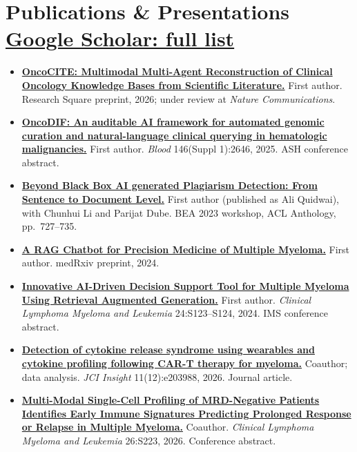 \documentclass[letterpaper,11pt]{article}
\newenvironment{bullets}{\begin{itemize}[leftmargin=12pt,itemsep=2pt,parsep=0pt,topsep=1.5pt]}{\end{itemize}\vspace{3pt}}
\begin{document}
\section{Publications \& Presentations \hfill \normalfont\small\href{https://scholar.google.com/citations?user=rAAtZi0AAAAJ}{Google Scholar: full list}}
\begin{small}\fontsize{10.2}{11.8}\selectfont\begin{bullets}
  \item \href{https://doi.org/10.21203/rs.3.rs-9160944/v1}{\textbf{OncoCITE: Multimodal Multi-Agent Reconstruction of Clinical Oncology Knowledge Bases from Scientific Literature.}}
  First author. Research Square preprint, 2026; under review at \textit{Nature Communications}.
  \item \href{https://doi.org/10.1182/blood-2025-2646}{\textbf{OncoDIF: An auditable AI framework for automated genomic curation and natural-language clinical querying in hematologic malignancies.}}
  First author. \textit{Blood} 146(Suppl 1):2646, 2025. ASH conference abstract.
  \item \href{https://doi.org/10.18653/v1/2023.bea-1.58}{\textbf{Beyond Black Box AI generated Plagiarism Detection: From Sentence to Document Level.}}
  First author (published as Ali Quidwai), with Chunhui Li and Parijat Dube. BEA 2023 workshop, ACL Anthology, pp.\ 727--735.
  \item \href{https://doi.org/10.1101/2024.03.14.24304293}{\textbf{A RAG Chatbot for Precision Medicine of Multiple Myeloma.}}
  First author. medRxiv preprint, 2024.
  \item \href{https://doi.org/10.1016/s2152-2650(24)02048-2}{\textbf{Innovative AI-Driven Decision Support Tool for Multiple Myeloma Using Retrieval Augmented Generation.}}
  First author. \textit{Clinical Lymphoma Myeloma and Leukemia} 24:S123--S124, 2024. IMS conference abstract.
  \item \href{https://doi.org/10.1172/jci.insight.203988}{\textbf{Detection of cytokine release syndrome using wearables and cytokine profiling following CAR-T therapy for myeloma.}}
  Coauthor; data analysis. \textit{JCI Insight} 11(12):e203988, 2026. Journal article.
  \item \href{https://doi.org/10.1016/s2152-2650(26)03675-x}{\textbf{Multi-Modal Single-Cell Profiling of MRD-Negative Patients Identifies Early Immune Signatures Predicting Prolonged Response or Relapse in Multiple Myeloma.}}
  Coauthor. \textit{Clinical Lymphoma Myeloma and Leukemia} 26:S223, 2026. Conference abstract.

\end{bullets}
\end{small}
\end{document}
